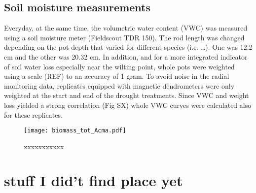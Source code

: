 \documentclass{article}
\begin{document}
	\subsection*{Soil moisture measurements}
	Everyday, at the same time, the volumetric water content (VWC) was measured using a soil moisture meter (Fieldscout TDR 150). The rod length was changed depending on the pot depth that varied for different species (i.e. …). One was 12.2 cm and the other was 20.32 cm. In addition, and for a more integrated indicator of soil water loss especially near the wilting point, whole pots were weighted using a scale (REF) to an accuracy of 1 gram. To avoid noise in the radial monitoring data, replicates equipped with magnetic dendrometers were only weighted at the start and end of the drought treatments. Since VWC and weight loss yielded a strong correlation (Fig SX) whole VWC curves were calculated also for these replicates.
	
	
	
	
	
	\begin{figure}
		\centering
		\texttt{[image: biomass\_tot\_Acma.pdf]} 
		\caption{xxxxxxxxxxx}
		\label{fig:fig_1xxx}
	\end{figure}
	
	
	
	\section*{stuff I did't find place yet}
	
	
	\newpage
	
	
	
	
	
	
	
	
	
	
\end{document}
